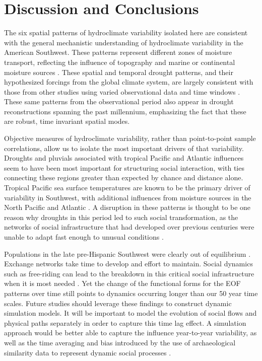 \documentclass[10pt]{iopart}
\begin{document}
\section*{Discussion and Conclusions}

The six spatial patterns of hydroclimate variability isolated here are consistent with the general mechanistic understanding of hydroclimate variability in the American Southwest. These patterns represent different zones of moisture transport, reflecting the influence of topography and marine or continental moisture sources \parencite{Liu2010, Hu2011}. These spatial and temporal drought patterns, and their hypothesized forcings from the global climate system, are largely consistent with those from other studies using varied observational data and time windows \parencite{Comrie1999,Cook1999,McCabe1999,McCabe2004,Ryu2010,Seager2014,Herrmann2016}. These same patterns from the observational period also appear in drought reconstructions spanning the past millennium, emphasizing the fact that these are robust, time invariant spatial modes.

Objective measures of hydroclimate variability, rather than point-to-point sample correlations, allow us to isolate the most important drivers of that variability. Droughts and pluvials associated with tropical Pacific and Atlantic influences seem to have been most important for structuring social interaction, with ties connecting these regions greater than expected by chance and distance alone. Tropical Pacific sea surface temperatures are known to be the primary driver of variability in Southwest, with additional influences from moisture sources in the North Pacific and Atlantic \parencite{McCabe2004}. A disruption in these patterns is thought to be one reason why droughts in this period led to such social transformation, as the networks of social infrastructure that had developed over previous centuries were unable to adapt fast enough to unusual conditions \parencite{Cordell2007}. 

Populations in the late pre-Hispanic Southwest were clearly out of equilibrium \parencite{Hill2004}. Exchange networks take time to develop and effort to maintain. Social dynamics such as free-riding can lead to the breakdown in this critical social infrastructure when it is most needed \parencite{Kohler1996}. Yet the change of the functional forms for the EOF patterns over time still points to dynamics occurring longer than our 50 year time scales. Future studies should leverage these findings to construct dynamic simulation models. It will be important to model the evolution of social flows and physical paths separately \parencite{Bevan2013} in order to capture this time lag effect. A simulation approach would be better able to capture the influence year-to-year variability, as well as the time averaging and bias introduced by the use of archaeological similarity data to represent dynamic social processes \parencite{Crema2014,Crema2016}.
\end{document}
